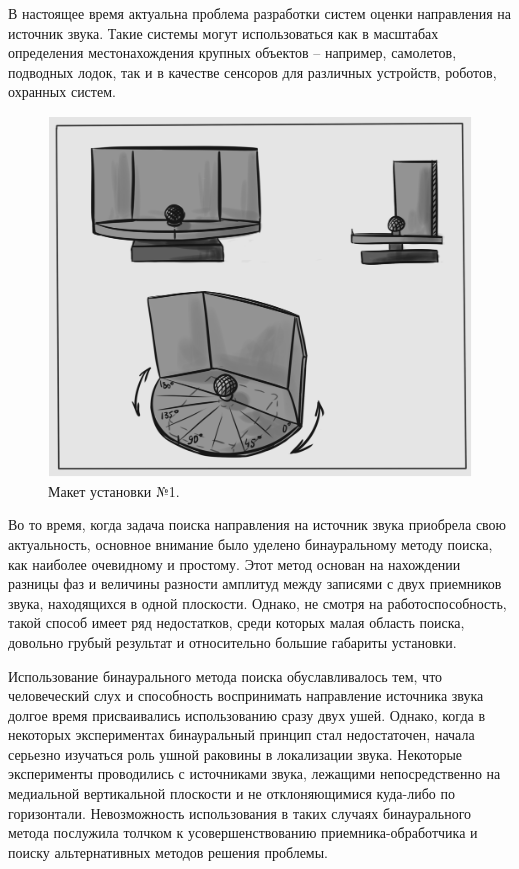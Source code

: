 В настоящее время актуальна проблема разработки систем оценки направления на источник звука. Такие системы могут использоваться как в масштабах определения местонахождения крупных объектов – например, самолетов, подводных лодок, так и в качестве сенсоров для различных устройств, роботов, охранных систем. 

\begin{figure}[ht] 
	\center
	\includegraphics [scale=0.4] {./myimages/pictMaket}
	\caption{Макет установки №1.} 
	\label{img:pictMaket}  
\end{figure}

Во то время, когда задача поиска направления на источник звука приобрела свою актуальность, основное внимание было уделено бинауральному методу поиска, как наиболее очевидному и простому. Этот метод основан на нахождении разницы фаз и величины разности амплитуд между записями с двух приемников звука, находящихся в одной плоскости. Однако, не смотря на работоспособность, такой способ имеет ряд недостатков, среди которых малая область поиска, довольно грубый результат и относительно большие габариты установки.

Использование бинаурального метода поиска обуславливалось тем, что человеческий слух и способность воспринимать направление источника звука долгое время присваивались использованию сразу двух ушей. Однако, когда в некоторых экспериментах бинауральный принцип стал недостаточен, начала серьезно изучаться роль ушной раковины в локализации звука. Некоторые эксперименты проводились с источниками звука, лежащими непосредственно на  медиальной вертикальной плоскости и не отклоняющимися куда-либо по горизонтали. Невозможность использования в таких случаях бинаурального метода послужила толчком к усовершенствованию приемника-обработчика и поиску альтернативных методов решения проблемы.
